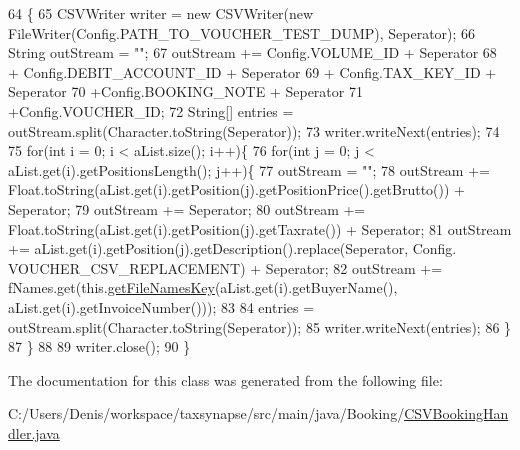 \begin{DoxyCode}
64                                                                                                            
                                       \{
65         CSVWriter writer = \textcolor{keyword}{new} CSVWriter(\textcolor{keyword}{new} FileWriter(Config.PATH\_TO\_VOUCHER\_TEST\_DUMP), Seperator);
66         String outStream = \textcolor{stringliteral}{""};
67         outStream += Config.VOLUME\_ID + Seperator
68                 + Config.DEBIT\_ACCOUNT\_ID + Seperator
69                 + Config.TAX\_KEY\_ID + Seperator
70                 +Config.BOOKING\_NOTE + Seperator
71                 +Config.VOUCHER\_ID;
72         String[] entries = outStream.split(Character.toString(Seperator));
73         writer.writeNext(entries);
74         
75         \textcolor{keywordflow}{for}(\textcolor{keywordtype}{int} i = 0; i < aList.size(); i++)\{
76             \textcolor{keywordflow}{for}(\textcolor{keywordtype}{int} j = 0; j < aList.get(i).getPositionsLength(); j++)\{
77                 outStream = \textcolor{stringliteral}{""};
78                 outStream += Float.toString(aList.get(i).getPosition(j).getPositionPrice().getBrutto()) + 
      Seperator;
79                 outStream += Seperator;
80                 outStream += Float.toString(aList.get(i).getPosition(j).getTaxrate()) + Seperator;
81                 outStream += aList.get(i).getPosition(j).getDescription().replace(Seperator, Config.
      VOUCHER\_CSV\_REPLACEMENT) + Seperator;
82                 outStream += fNames.get(this.\hyperlink{class_booking_1_1_c_s_v_booking_handler_a079ed3880466f90e57969cd85157dfe2}{getFileNamesKey}(aList.get(i).getBuyerName(), 
      aList.get(i).getInvoiceNumber()));
83                 
84                 entries = outStream.split(Character.toString(Seperator));
85                 writer.writeNext(entries);
86             \}
87         \}
88         
89         writer.close();
90     \}
\end{DoxyCode}


The documentation for this class was generated from the following file\+:\begin{DoxyCompactItemize}
\item 
C\+:/\+Users/\+Denis/workspace/taxsynapse/src/main/java/\+Booking/\hyperlink{_c_s_v_booking_handler_8java}{C\+S\+V\+Booking\+Handler.\+java}\end{DoxyCompactItemize}
